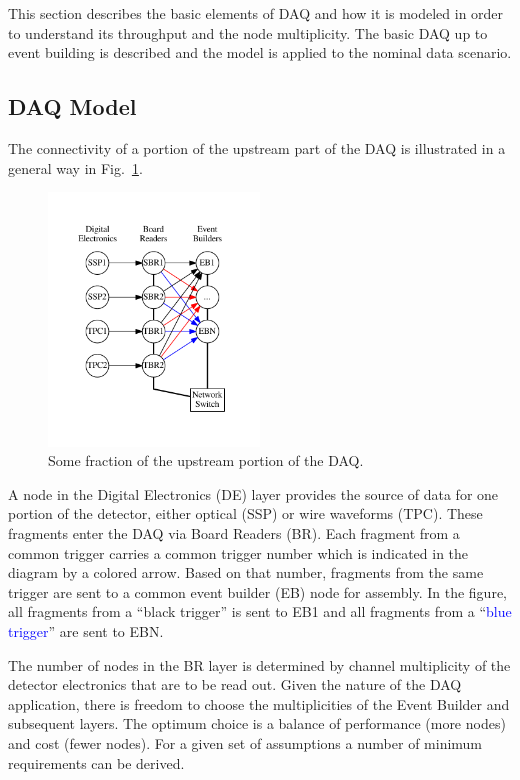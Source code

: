 \documentclass[pdftex,12pt,letter]{article}
\begin{document}
This section describes the basic elements of DAQ and how it is modeled in order to understand
its throughput and the node multiplicity.  The basic DAQ up to event
building is described and the model is applied to the nominal data
scenario.
\subsection{DAQ Model}
The connectivity of a portion of the upstream part of the DAQ is
illustrated in a general way in Fig.~\ref{fig:upstream}.
\begin{figure}[htbp]
  \centering
  \includegraphics[width=0.5\textwidth]{../figures/upstream.pdf}
  \caption{Some fraction of the upstream portion of the DAQ.}
  \label{fig:upstream}
\end{figure}
A node in
the Digital Electronics (DE) layer provides the source of data for one
portion of the detector, either optical (SSP) or wire waveforms (TPC).
These fragments enter the DAQ via Board Readers (BR).  Each fragment
from a common trigger carries a common trigger number which is
indicated in the diagram by a colored arrow.  Based on that number,
fragments from the same trigger are sent to a common event builder
(EB) node for assembly.  In the figure, all fragments from a ``black
trigger'' is sent to EB1 and all fragments from a
``\textcolor{blue}{blue trigger}'' are sent to EBN.

The number of nodes in the BR layer is determined by channel
multiplicity of the detector electronics that are to be read out.
Given the nature of the DAQ application, there is freedom to choose
the multiplicities of the Event Builder and subsequent layers.  The optimum choice is a balance of performance (more
nodes) and cost (fewer nodes).  For a given set of assumptions a
number of minimum requirements can be derived.
\end{document}
